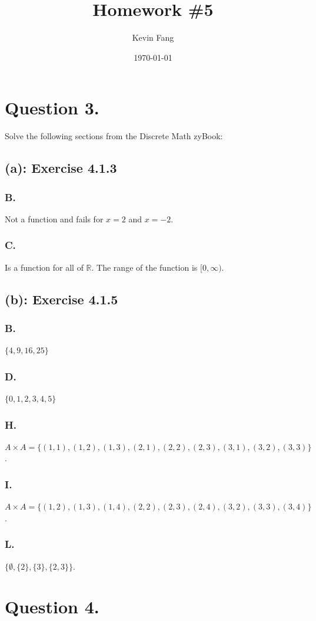\documentclass[titlepage]{article}\pagestyle{empty}
\author{Kevin Fang}
\title{Homework \#5}
\date{\today}
\begin{document}
\maketitle

\pagebreak
\section*{Question 3.} Solve the following sections from the Discrete Math zyBook:
\subsection*{(a): Exercise 4.1.3} 
\subsubsection*{B.} Not a function and fails for $x = 2$ and $x = -2$.
\subsubsection*{C.} Is a function for all of $\mathbb{R}$. The range of the function is $[0,\infty)$.
\subsection*{(b): Exercise 4.1.5} 
\subsubsection*{B.} 
$\{4,9,16,25\}$
\subsubsection*{D.}
$\{0, 1, 2, 3, 4, 5\}$
\subsubsection*{H.} 
$A \times A = \{(1,1),(1,2),(1,3),(2,1),(2,2),(2,3),(3,1),(3,2),(3,3)\}$.
\subsubsection*{I.} 
$A \times A = \{(1,2),(1,3),(1,4),(2,2),(2,3),(2,4),(3,2),(3,3),(3,4)\}$.
\subsubsection*{L.} 
$\{\emptyset, \{2\}, \{3\}, \{2, 3\}\}.$

\pagebreak
\section*{Question 4.}
\end{document}
